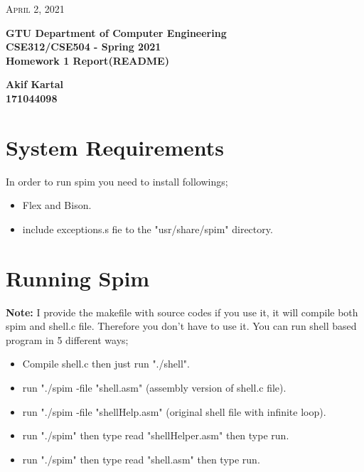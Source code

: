 \documentclass{article}
\begin{document}
\begin{titlepage}

	\begin{flushright}
	\textsc{\large April 2, 2021} \\
	\end{flushright}
	\begin{center}
	\Large{\bfseries GTU Department of Computer Engineering \\ CSE312/CSE504 - Spring 2021 \\ Homework 1 Report(README)  } \\
	\end{center}
	\vspace*{\fill}
	\begin{center}
	\Large{\bfseries Akif Kartal \\ 171044098 }
	\end{center}
	\vspace*{\fill}

\end{titlepage}

\cleardoublepage
\section{System Requirements}
In order to run spim you need to install followings;
\begin{itemize}
	\item Flex and Bison.
	\item include exceptions.s fie to the "usr/share/spim" directory.
\end{itemize}

\section{Running Spim}
\textbf{Note:} I provide the makefile with source codes if you use it, it will compile both spim and shell.c file. Therefore you don't have to use it.
You can run shell based program in 5 different ways;
\begin{itemize}
	\item Compile shell.c then just run "./shell".
	\item run "./spim -file "shell.asm" (assembly version of shell.c file).
	\item run "./spim -file "shellHelp.asm" (original shell file with infinite loop).
	\item run "./spim" then type read "shellHelper.asm" then type run.
	\item run "./spim" then type read "shell.asm" then type run.
\end{itemize}
\end{document}
